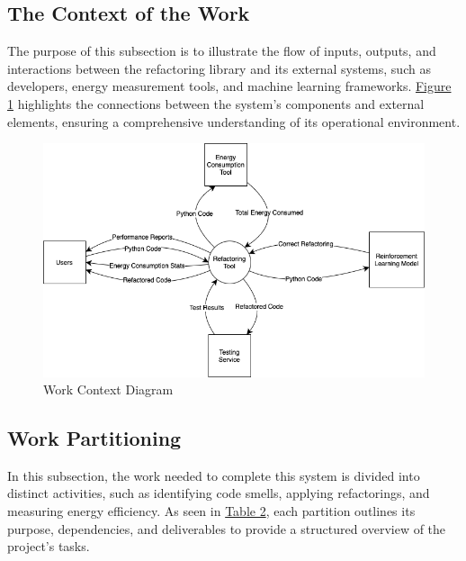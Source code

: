 \documentclass[12pt]{article}
\begin{document}
\subsection{The Context of the Work}
The purpose of this subsection is to illustrate the flow of inputs,
outputs, and interactions between the refactoring library and its
external systems, such as developers, energy measurement tools, and
machine learning frameworks. \hyperref[img:work-context]{Figure 1}
highlights the connections between the system's components and
external elements, ensuring a comprehensive understanding of its
operational environment.

\begin{figure}[H]
  \centering
  \includegraphics[scale=0.5]{../Images/WorkContextModel.png}
  \caption{Work Context Diagram}
  \label{img:work-context}
\end{figure}

\newpage
\subsection{Work Partitioning}
In this subsection, the work needed to complete this system is
divided into distinct activities, such as identifying code smells,
applying refactorings, and measuring energy efficiency. As seen in
\hyperref[tab:work-part]{Table 2}, each partition outlines its
purpose, dependencies, and deliverables to provide a structured
overview of the project's tasks.
\end{document}
